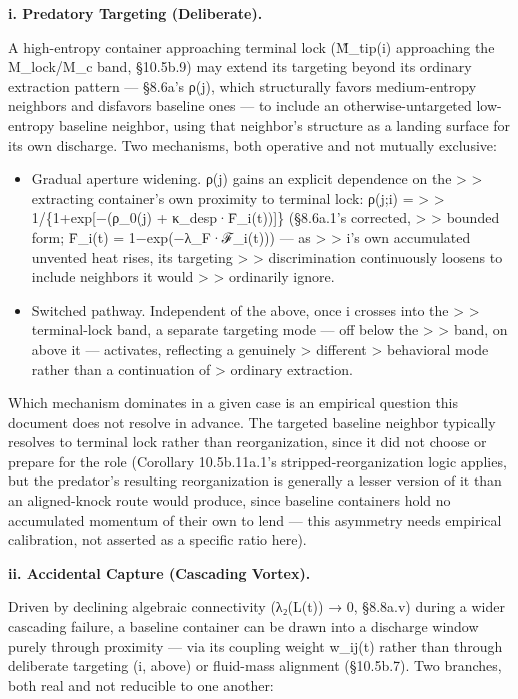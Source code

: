 \documentclass[
]{article}
\begin{document}
\textbf{i. Predatory Targeting (Deliberate).}

A high-entropy container approaching terminal lock (M̃\_tip(i)
approaching the M\_lock/M\_c band, §10.5b.9) may extend its targeting
beyond its ordinary extraction pattern --- §8.6a's ρ(j), which
structurally favors medium-entropy neighbors and disfavors baseline ones
--- to include an otherwise-untargeted low-entropy baseline neighbor,
using that neighbor's structure as a landing surface for its own
discharge. Two mechanisms, both operative and not mutually exclusive:

\begin{itemize}
\item
  Gradual aperture widening. ρ(j) gains an explicit dependence on the
  \textgreater{} \textgreater{} extracting container's own proximity to
  terminal lock: ρ(j;i) = \textgreater{} \textgreater{}
  1/\{1+exp{[}−(ρ\_0(j) + κ\_desp·F̄\_i(t)){]}\} (§8.6a.1's corrected,
  \textgreater{} \textgreater{} bounded form; F̄\_i(t) =
  1−exp(−λ\_F·ℱ\_i(t))) --- as \textgreater{} \textgreater{} i's own
  accumulated unvented heat rises, its targeting \textgreater{}
  \textgreater{} discrimination continuously loosens to include
  neighbors it would \textgreater{} \textgreater{} ordinarily ignore.
\item
  Switched pathway. Independent of the above, once i crosses into the
  \textgreater{} \textgreater{} terminal-lock band, a separate targeting
  mode --- off below the \textgreater{} \textgreater{} band, on above it
  --- activates, reflecting a genuinely \textgreater{} different
  \textgreater{} behavioral mode rather than a continuation of
  \textgreater{} ordinary extraction.
\end{itemize}

Which mechanism dominates in a given case is an empirical question this
document does not resolve in advance. The targeted baseline neighbor
typically resolves to terminal lock rather than reorganization, since it
did not choose or prepare for the role (Corollary 10.5b.11a.1's
stripped-reorganization logic applies, but the predator's resulting
reorganization is generally a lesser version of it than an aligned-knock
route would produce, since baseline containers hold no accumulated
momentum of their own to lend --- this asymmetry needs empirical
calibration, not asserted as a specific ratio here).

\textbf{ii. Accidental Capture (Cascading Vortex).}

Driven by declining algebraic connectivity (λ₂(L(t)) → 0, §8.8a.v)
during a wider cascading failure, a baseline container can be drawn into
a discharge window purely through proximity --- via its coupling weight
w\_ij(t) rather than through deliberate targeting (i, above) or
fluid-mass alignment (§10.5b.7). Two branches, both real and not
reducible to one another:
\end{document}
